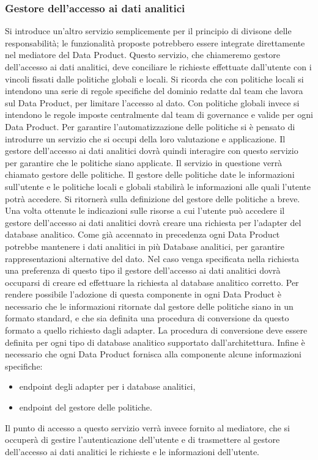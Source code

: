 \documentclass[12pt]{report}
\begin{document}
\subsubsection{Gestore dell'accesso ai dati analitici}
Si introduce un'altro servizio semplicemente per il principio di divisone delle responsabilità; le funzionalità proposte potrebbero essere integrate direttamente nel mediatore del Data Product. 
Questo servizio, che chiameremo gestore dell'accesso ai dati analitici, deve conciliare le richieste effettuate dall'utente con i vincoli fissati dalle politiche globali e locali.
Si ricorda che con politiche locali si intendono una serie di regole specifiche del dominio redatte dal team che lavora sul  Data Product, per limitare l'accesso al dato.
Con politiche globali invece si intendono le regole imposte centralmente dal team di governance e valide per ogni Data Product.
Per garantire l'automatizzazione delle politiche si è pensato di introdurre un servizio che si occupi della loro valutazione e applicazione.
Il gestore dell'accesso ai dati analitici dovrà quindi interagire con questo servizio per garantire che le politiche siano applicate.
Il servizio in questione verrà chiamato gestore delle politiche. 
Il gestore delle politiche date le informazioni sull'utente e le politiche locali e globali stabilirà le informazioni alle quali l'utente potrà accedere. 
Si ritornerà sulla definizione del gestore delle politiche a breve.
Una volta ottenute le indicazioni sulle risorse a cui l'utente può accedere il gestore dell'accesso ai dati analitici dovrà creare una richiesta per l'adapter del database analitico.
Come già accennato in precedenza ogni Data Product potrebbe mantenere i dati analitici in più Database analitici, per garantire rappresentazioni alternative del dato.
Nel caso venga specificata nella richiesta una preferenza di questo tipo il gestore dell'accesso ai dati analitici dovrà occuparsi di creare ed effettuare la richiesta al database analitico corretto.
Per rendere possibile l'adozione di questa componente in ogni Data Product è necessario  che le informazioni ritornate dal gestore delle politiche siano in un formato standard, e che sia definita una procedura di conversione da questo formato a quello richiesto dagli adapter.
La procedura di conversione deve essere definita per ogni tipo di database analitico supportato dall'architettura.
Infine è necessario che ogni Data Product fornisca alla componente alcune informazioni specifiche: 
\begin{itemize}
    \item endpoint degli adapter per i database analitici,
    \item endpoint del gestore delle politiche. 
\end{itemize}
Il punto di accesso a questo servizio verrà invece fornito al mediatore, che si occuperà di gestire l'autenticazione dell'utente e di trasmettere al gestore dell'accesso ai dati analitici le richieste e le informazioni dell'utente.
\end{document}
